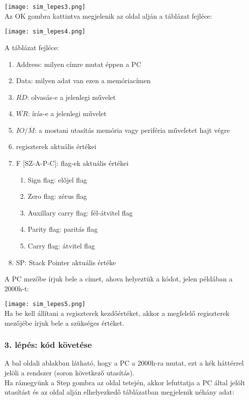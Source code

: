 \texttt{[image: sim\_lepes3.png]} \\
Az OK gombra kattintva megjelenik az oldal alján a táblázat fejléce:

\texttt{[image: sim\_lepes4.png]}

A táblázat fejléce:
\begin{enumerate}
  \item Address: milyen címre mutat éppen a PC
  \item Data: milyen adat van ezen a memóriacímen
  \item $\overline{RD}$: olvasás-e a jelenlegi művelet
  \item $\overline{WR}$: írás-e a jelenlegi művelet
  \item $IO/\overline{M}$: a mostani utasítás memória vagy periféria műveletet hajt végre
  \item regiszterek aktuális értékei
  \item F [SZ-A-P-C]: flag-ek aktuális értékei
  \begin{enumerate}
    \item Sign flag: előjel flag
    \item Zero flag: zérus flag
    \item Auxillary carry flag: fél-átvitel flag
    \item Parity flag: paritás flag
    \item Carry flag: átvitel flag
  \end{enumerate}
  \item SP: Stack Pointer aktuális értéke
\end{enumerate}
A PC mezőbe írjuk bele a címet, ahova helyeztük a kódot, jelen példában a 2000h-t:

\texttt{[image: sim\_lepes5.png]} \\
Ha be kell állítani a regiszterek kezdőértéket, akkor a megfelelő regiszterek mezőjébe írjuk bele a szükséges értéket.

\subsubsection{3. lépés: kód követése}

A bal oldali ablakban látható, hogy a PC a 2000h-ra mutat, ezt a kék háttérrel jelöli a rendszer (soron következő utasítás).\\
Ha rámegyünk a Step gombra az oldal tetején, akkor lefuttatja a PC által jelölt utasítást és az oldal alján elhelyezkedő táblázatban megjelenik néhány adat:


